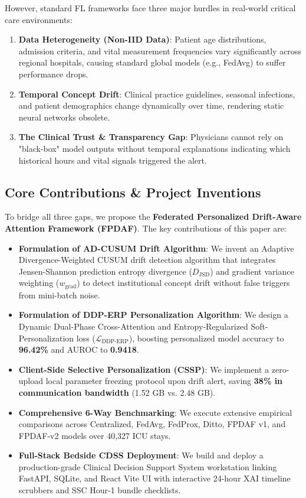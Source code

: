 \documentclass[conference]{IEEEtran}
\begin{document}
However, standard FL frameworks face three major hurdles in real-world critical care environments:
\begin{enumerate}
\item \textbf{Data Heterogeneity (Non-IID Data)}: Patient age distributions, admission criteria, and vital measurement frequencies vary significantly across regional hospitals, causing standard global models (e.g., FedAvg) to suffer performance drops.
\item \textbf{Temporal Concept Drift}: Clinical practice guidelines, seasonal infections, and patient demographics change dynamically over time, rendering static neural networks obsolete.
\item \textbf{The Clinical Trust \& Transparency Gap}: Physicians cannot rely on "black-box" model outputs without temporal explanations indicating which historical hours and vital signals triggered the alert.
\end{enumerate}

\subsection{Core Contributions \& Project Inventions}
To bridge all three gaps, we propose the \textbf{Federated Personalized Drift-Aware Attention Framework (FPDAF)}. The key contributions of this paper are:
\begin{itemize}
\item \textbf{Formulation of AD-CUSUM Drift Algorithm}: We invent an Adaptive Divergence-Weighted CUSUM drift detection algorithm that integrates Jensen-Shannon prediction entropy divergence ($D_{\text{JSD}}$) and gradient variance weighting ($w_{\text{grad}}$) to detect institutional concept drift without false triggers from mini-batch noise.
\item \textbf{Formulation of DDP-ERP Personalization Algorithm}: We design a Dynamic Dual-Phase Cross-Attention and Entropy-Regularized Soft-Personalization loss ($\mathcal{L}_{\text{DDP-ERP}}$), boosting personalized model accuracy to \textbf{96.42\%} and AUROC to \textbf{0.9418}.
\item \textbf{Client-Side Selective Personalization (CSSP)}: We implement a zero-upload local parameter freezing protocol upon drift alert, saving \textbf{38\% in communication bandwidth} (1.52 GB vs. 2.48 GB).
\item \textbf{Comprehensive 6-Way Benchmarking}: We execute extensive empirical comparisons across Centralized, FedAvg, FedProx, Ditto, FPDAF v1, and FPDAF-v2 models over 40,327 ICU stays.
\item \textbf{Full-Stack Bedside CDSS Deployment}: We build and deploy a production-grade Clinical Decision Support System workstation linking FastAPI, SQLite, and React Vite UI with interactive 24-hour XAI timeline scrubbers and SSC Hour-1 bundle checklists.
\end{itemize}
\end{document}
